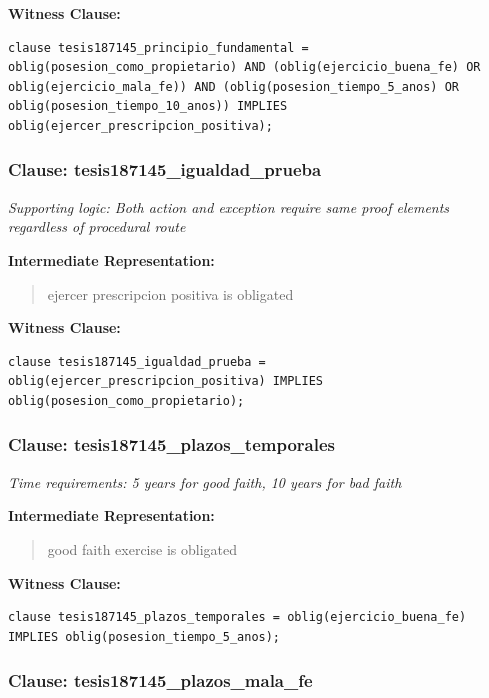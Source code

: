 \documentclass[11pt,a4paper]{article}
\begin{document}
\textbf{Witness Clause:}

\begin{lstlisting}[style=witnessstyle, language=Witness]
clause tesis187145_principio_fundamental = oblig(posesion_como_propietario) AND (oblig(ejercicio_buena_fe) OR oblig(ejercicio_mala_fe)) AND (oblig(posesion_tiempo_5_anos) OR oblig(posesion_tiempo_10_anos)) IMPLIES oblig(ejercer_prescripcion_positiva);
\end{lstlisting}

\subsubsection{Clause: tesis187145\_igualdad\_prueba}

\textit{Supporting logic: Both action and exception require same proof elements regardless of procedural route}

\textbf{Intermediate Representation:}

\begin{quote}
ejercer prescripcion positiva is obligated
\end{quote}

\textbf{Witness Clause:}

\begin{lstlisting}[style=witnessstyle, language=Witness]
clause tesis187145_igualdad_prueba = oblig(ejercer_prescripcion_positiva) IMPLIES oblig(posesion_como_propietario);
\end{lstlisting}

\subsubsection{Clause: tesis187145\_plazos\_temporales}

\textit{Time requirements: 5 years for good faith, 10 years for bad faith}

\textbf{Intermediate Representation:}

\begin{quote}
good faith exercise is obligated
\end{quote}

\textbf{Witness Clause:}

\begin{lstlisting}[style=witnessstyle, language=Witness]
clause tesis187145_plazos_temporales = oblig(ejercicio_buena_fe) IMPLIES oblig(posesion_tiempo_5_anos);
\end{lstlisting}

\subsubsection{Clause: tesis187145\_plazos\_mala\_fe}
\end{document}

